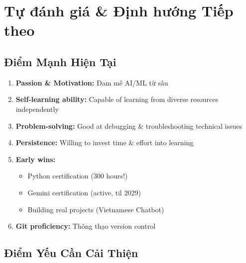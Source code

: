 \documentclass[12pt,a4paper]{article}
\begin{document}
\newpage


\section{Tự đánh giá \& Định hướng Tiếp theo}

\subsection{Điểm Mạnh Hiện Tại}

\begin{enumerate}
    \item \textbf{Passion \& Motivation:} Đam mê AI/ML từ sâu
    \item \textbf{Self-learning ability:} Capable of learning from diverse resources independently
    \item \textbf{Problem-solving:} Good at debugging \& troubleshooting technical issues
    \item \textbf{Persistence:} Willing to invest time \& effort into learning
    \item \textbf{Early wins:} 
    \begin{itemize}
        \item Python certification (300 hours!)
        \item Gemini certification (active, til 2029)
        \item Building real projects (Vietnamese Chatbot)
    \end{itemize}
    \item \textbf{Git proficiency:} Thông thạo version control
\end{enumerate}

\subsection{Điểm Yếu Cần Cải Thiện}
\end{document}
